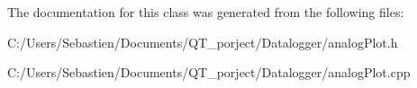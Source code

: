 The documentation for this class was generated from the following files\+:\begin{DoxyCompactItemize}
\item 
C\+:/\+Users/\+Sebastien/\+Documents/\+Q\+T\+\_\+porject/\+Datalogger/analog\+Plot.\+h\item 
C\+:/\+Users/\+Sebastien/\+Documents/\+Q\+T\+\_\+porject/\+Datalogger/analog\+Plot.\+cpp\end{DoxyCompactItemize}
